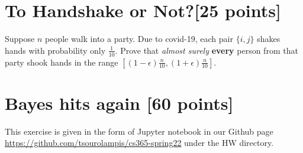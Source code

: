 \section{To Handshake or Not?[25 points]} 

Suppose $n$ people walk into a party. Due to covid-19, each pair $\{i,j\}$ shakes hands with probability only $\frac{1}{10}$. Prove that {\it almost surely} {\bf every} person from that party shook hands in the range $[ (1-\epsilon)\frac{n}{10}, (1+\epsilon)\frac{n}{10}]$. 


\section{Bayes hits again [60 points]}

This exercise is given in the form of Jupyter notebook in our Github page \url{https://github.com/tsourolampis/cs365-spring22} under the HW directory.

 
 


